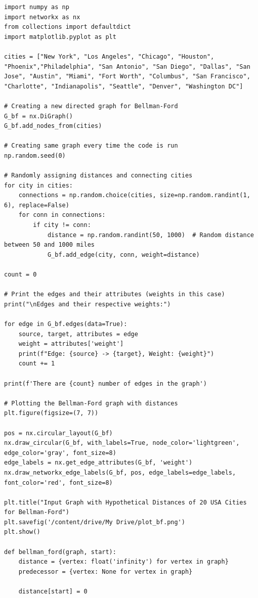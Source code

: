 \documentclass[lettersize,journal]{IEEEtran}
\begin{document}
\begin{lstlisting}[caption={Bellman-Ford Algorithm}]
import numpy as np
import networkx as nx
from collections import defaultdict
import matplotlib.pyplot as plt

cities = ["New York", "Los Angeles", "Chicago", "Houston", "Phoenix","Philadelphia", "San Antonio", "San Diego", "Dallas", "San Jose", "Austin", "Miami", "Fort Worth", "Columbus", "San Francisco", "Charlotte", "Indianapolis", "Seattle", "Denver", "Washington DC"]

# Creating a new directed graph for Bellman-Ford
G_bf = nx.DiGraph()
G_bf.add_nodes_from(cities)

# Creating same graph every time the code is run
np.random.seed(0)

# Randomly assigning distances and connecting cities
for city in cities:
    connections = np.random.choice(cities, size=np.random.randint(1, 6), replace=False)
    for conn in connections:
        if city != conn:
            distance = np.random.randint(50, 1000)  # Random distance between 50 and 1000 miles
            G_bf.add_edge(city, conn, weight=distance)

count = 0

# Print the edges and their attributes (weights in this case)
print("\nEdges and their respective weights:")

for edge in G_bf.edges(data=True):
    source, target, attributes = edge
    weight = attributes['weight']
    print(f"Edge: {source} -> {target}, Weight: {weight}")
    count += 1

print(f'There are {count} number of edges in the graph')

# Plotting the Bellman-Ford graph with distances
plt.figure(figsize=(7, 7))

pos = nx.circular_layout(G_bf)
nx.draw_circular(G_bf, with_labels=True, node_color='lightgreen', edge_color='gray', font_size=8)
edge_labels = nx.get_edge_attributes(G_bf, 'weight')
nx.draw_networkx_edge_labels(G_bf, pos, edge_labels=edge_labels, font_color='red', font_size=8)

plt.title("Input Graph with Hypothetical Distances of 20 USA Cities for Bellman-Ford")
plt.savefig('/content/drive/My Drive/plot_bf.png')
plt.show()

def bellman_ford(graph, start):
    distance = {vertex: float('infinity') for vertex in graph}
    predecessor = {vertex: None for vertex in graph}

    distance[start] = 0


\end{lstlisting}
\end{document}
